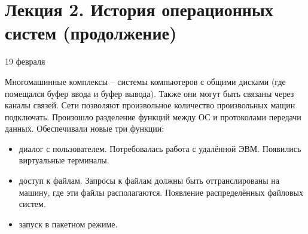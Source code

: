 \documentclass[a4paper,12pt]{article}
\begin{document}
	\section{\bf Лекция 2. История операционных систем (продолжение)}
	\centerline{19 февраля}
	Многомашинные комплексы -- системы компьютеров с общими дисками (где помещался буфер ввода
и буфер вывода). Также они могут быть связаны через каналы связей.
	Сети позволяют произвольное количество произвольных мащин подключать. Произошло разделение
функций между ОС и протоколами передачи данных. Обеспечивали новые три функции:
	\begin{itemize}
		\item диалог с пользователем. Потребовалась работа с удалённой ЭВМ. Появились 
		виртуальные терминалы.
		\item доступ к файлам. Запросы к файлам должны быть оттранслированы на машину, где эти 
		файлы располагаются. Появление распределённых файловых систем.
		\item запуск в пакетном режиме.
	\end{itemize}
\end{document}
